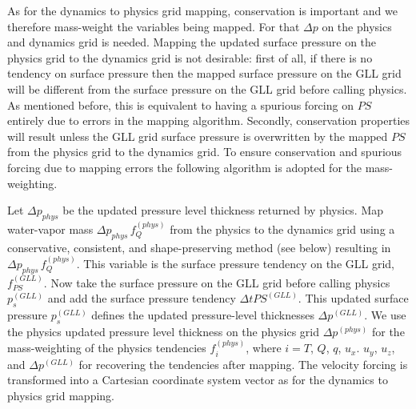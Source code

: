 As for the dynamics to physics grid mapping, conservation is important and we therefore mass-weight the variables being mapped. For that $\Delta p$ on the physics and dynamics grid is needed. Mapping the updated surface pressure on the physics grid to the dynamics grid is not desirable: first of all, if there is no tendency on surface pressure then the mapped surface pressure on the GLL grid will be different from the surface pressure on the GLL grid before calling physics. As mentioned before, this is equivalent to having a spurious forcing on $PS$ entirely due to errors in the mapping algorithm. Secondly, conservation properties will result unless the GLL grid surface pressure is overwritten by the mapped $PS$ from the physics grid to the dynamics grid. To ensure conservation and spurious forcing due to mapping errors the following algorithm is adopted for the mass-weighting.

Let $\Delta p_{phys}$ be the updated pressure level thickness returned by physics. Map water-vapor mass $\Delta p_{phys}\, f_Q^{(phys)}$ from the physics to the dynamics grid using a conservative, consistent, and shape-preserving method (see below) resulting in $\Delta p_{phys}\, f_Q^{(phys)}$. This variable is the surface pressure tendency on the GLL grid, $f_{PS}^{(GLL)}$. Now take the surface pressure on the GLL grid before calling physics $p_s^{(GLL)}$ and add the surface pressure tendency $\Delta t PS^{(GLL)}$. This updated surface pressure $p_s^{(GLL)}$ defines the updated pressure-level thicknesses $\Delta p^{(GLL)}$. We use the physics updated pressure level thickness on the physics grid $\Delta p^{(phys)}$ for the mass-weighting of the physics tendencies $f^{(phys)}_i$, where $i=T$, $Q$, $q$, $u_x$. $u_y$, $u_z$, and $\Delta p^{(GLL)}$ for recovering the tendencies after mapping. The velocity forcing is transformed into a Cartesian coordinate system vector as for the dynamics to physics grid mapping.


